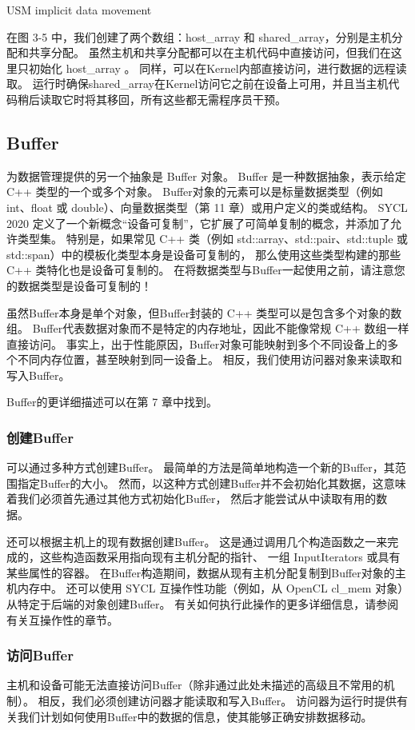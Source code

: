 {\color{red} USM implicit data movement }

在图 3-5 中，我们创建了两个数组：host\_array 和 shared\_array，分别是主机分配和共享分配。 
虽然主机和共享分配都可以在主机代码中直接访问，但我们在这里只初始化 host\_array 。 
同样，可以在Kernel内部直接访问，进行数据的远程读取。 
运行时确保shared\_array在Kernel访问它之前在设备上可用，并且当主机代码稍后读取它时将其移回，所有这些都无需程序员干预。

\subsection{Buffer}
为数据管理提供的另一个抽象是 Buffer 对象。 Buffer 是一种数据抽象，表示给定 C++ 类型的一个或多个对象。 
Buffer对象的元素可以是标量数据类型（例如 int、float 或 double）、向量数据类型（第 11 章）或用户定义的类或结构。 
SYCL 2020 定义了一个新概念“设备可复制”，它扩展了可简单复制的概念，并添加了允许类型集。 
特别是，如果常见 C++ 类（例如 std::array、std::pair、std::tuple 或 std::span）中的模板化类型本身是设备可复制的，
那么使用这些类型构建的那些 C++ 类特化也是设备可复制的。 
在将数据类型与Buffer一起使用之前，请注意您的数据类型是设备可复制的！

虽然Buffer本身是单个对象，但Buffer封装的 C++ 类型可以是包含多个对象的数组。 
Buffer代表数据对象而不是特定的内存地址，因此不能像常规 C++ 数组一样直接访问。 
事实上，出于性能原因，Buffer对象可能映射到多个不同设备上的多个不同内存位置，甚至映射到同一设备上。 
相反，我们使用访问器对象来读取和写入Buffer。

Buffer的更详细描述可以在第 7 章中找到。

\subsubsection{创建Buffer}
可以通过多种方式创建Buffer。 最简单的方法是简单地构造一个新的Buffer，其范围指定Buffer的大小。 
然而，以这种方式创建Buffer并不会初始化其数据，这意味着我们必须首先通过其他方式初始化Buffer，
然后才能尝试从中读取有用的数据。

还可以根据主机上的现有数据创建Buffer。 
这是通过调用几个构造函数之一来完成的，这些构造函数采用指向现有主机分配的指针、
一组 InputIterators 或具有某些属性的容器。 在Buffer构造期间，数据从现有主机分配复制到Buffer对象的主机内存中。 
还可以使用 SYCL 互操作性功能（例如，从 OpenCL cl\_mem 对象）从特定于后端的对象创建Buffer。 
有关如何执行此操作的更多详细信息，请参阅有关互操作性的章节。

\subsubsection{访问Buffer}
主机和设备可能无法直接访问Buffer（除非通过此处未描述的高级且不常用的机制）。 
相反，我们必须创建访问器才能读取和写入Buffer。 
访问器为运行时提供有关我们计划如何使用Buffer中的数据的信息，使其能够正确安排数据移动。

